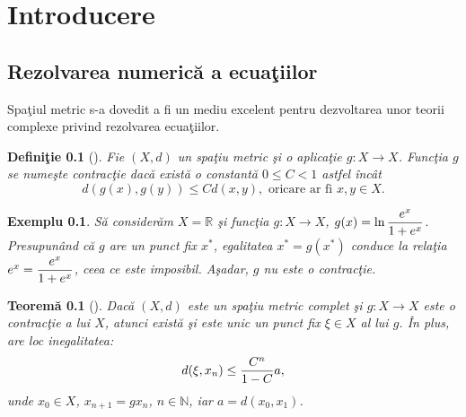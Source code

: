 \documentclass[a4paper,12pt,twoside,reqno]{report}
\newtheorem{theorem}{Teorem\u a}[chapter]
\newtheorem{definition}{Defini\c tie}[chapter]
\newtheorem{example}{Exemplu}[chapter]
\begin{document}
\mbox{}
\thispagestyle{empty}
\newpage
\renewcommand{\arraystretch}{1.2}
{\small {{\tableofcontents} }

\mbox{} \thispagestyle{empty}
\newpage
\chapter*{Introducere}






\section{Rezolvarea numeric\u a a ecua\c tiilor}

Spa\c tiul metric s-a dovedit a fi un mediu excelent pentru
dezvoltarea unor teorii  complexe privind rezolvarea ecua\c tiilor.

\begin{definition}[\cite{Po}] \rm  Fie $(X,d)$ un spa\c tiu metric \c si o aplica\c tie
$g\colon X\to X$. Func\c tia $g$ se nume\c ste contrac\c tie
 dac\u a exist\u a o constant\u a $0\leq C<1$ astfel
\^inc\^at
$$d(g(x),g(y))\leq Cd(x,y),\,\, \mbox{oricare ar fi }x,y\in X.$$

\end{definition}



\begin{example}\rm
S\u a consider\u am  $X=\mathbb R$ \c si func\c tia $g\colon X\to
X$, $g(x)=\ln\displaystyle{e^x\over{1+e^x}}$. Presupun\^ and c\u a
$g$ are un punct fix $x^*$, egalitatea $x^*=g(x^*)$ conduce la
rela\c tia $e^x=\displaystyle{e^x\over{1+e^x}}$, ceea ce este
imposibil. A\c sadar, $g$ nu este o contrac\c tie.
\end{example}



\begin{theorem}[\cite{Po}]\label{Banach} Dac\u a $(X,d)$ este un spa\c tiu metric complet \c si $g\colon X\to X$ este o contrac\c tie a lui $X$,
   atunci exist\u a \c si este unic un punct fix $\xi \in X$ al lui $g$. \^In plus, are loc inegalitatea:
  \begin{equation}\label{distanta}
    d(\xi,x_n)\leq\displaystyle{C^n\over{1-C}}a,
  \end{equation}
unde  $x_0\in X$, $x_{n+1}=gx_n$, $n\in\mathbb N$, iar
  $a=d(x_0,x_1)$.
\end{theorem}



}
\end{document}
